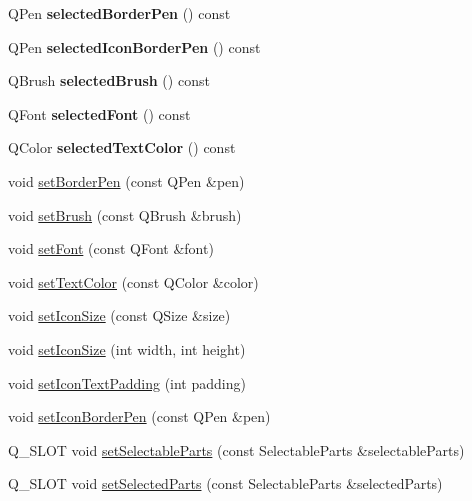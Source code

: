 \begin{DoxyCompactItemize}
Q\+Pen {\bfseries selected\+Border\+Pen} () const
\item 
\mbox{\label{class_q_c_p_legend_ad8eb320ca3a25928982a65163e8f883b}} 
Q\+Pen {\bfseries selected\+Icon\+Border\+Pen} () const
\item 
\mbox{\label{class_q_c_p_legend_a77dfa9340f68ca195f1817a93db09757}} 
Q\+Brush {\bfseries selected\+Brush} () const
\item 
\mbox{\label{class_q_c_p_legend_a483ffd35d64710a165da87b9d9f11110}} 
Q\+Font {\bfseries selected\+Font} () const
\item 
\mbox{\label{class_q_c_p_legend_ab9b469b27787bfb2ce6c8978a31821af}} 
Q\+Color {\bfseries selected\+Text\+Color} () const
\item 
void \hyperlink{class_q_c_p_legend_a866a9e3f5267de7430a6c7f26a61db9f}{set\+Border\+Pen} (const Q\+Pen \&pen)
\item 
void \hyperlink{class_q_c_p_legend_a497bbcd38baa3598c08e2b3f48103f23}{set\+Brush} (const Q\+Brush \&brush)
\item 
void \hyperlink{class_q_c_p_legend_aa4cda8499e3cb0f3be415edc02984c73}{set\+Font} (const Q\+Font \&font)
\item 
void \hyperlink{class_q_c_p_legend_ae1eb239ff4a4632fe1b6c3e668d845c6}{set\+Text\+Color} (const Q\+Color \&color)
\item 
void \hyperlink{class_q_c_p_legend_a8b0740cce488bf7010da6beda6898984}{set\+Icon\+Size} (const Q\+Size \&size)
\item 
void \hyperlink{class_q_c_p_legend_a96b1a37fd4ee6a9778e6e54fe56ab6c2}{set\+Icon\+Size} (int width, int height)
\item 
void \hyperlink{class_q_c_p_legend_a62973bd69d5155e8ea3141366e8968f6}{set\+Icon\+Text\+Padding} (int padding)
\item 
void \hyperlink{class_q_c_p_legend_a2f2c93d18a651f4ff294bb3f026f49b8}{set\+Icon\+Border\+Pen} (const Q\+Pen \&pen)
\item 
Q\+\_\+\+S\+L\+OT void \hyperlink{class_q_c_p_legend_a9ce60aa8bbd89f62ae4fa83ac6c60110}{set\+Selectable\+Parts} (const Selectable\+Parts \&selectable\+Parts)
\item 
Q\+\_\+\+S\+L\+OT void \hyperlink{class_q_c_p_legend_a2aee309bb5c2a794b1987f3fc97f8ad8}{set\+Selected\+Parts} (const Selectable\+Parts \&selected\+Parts)

\end{DoxyCompactItemize}
